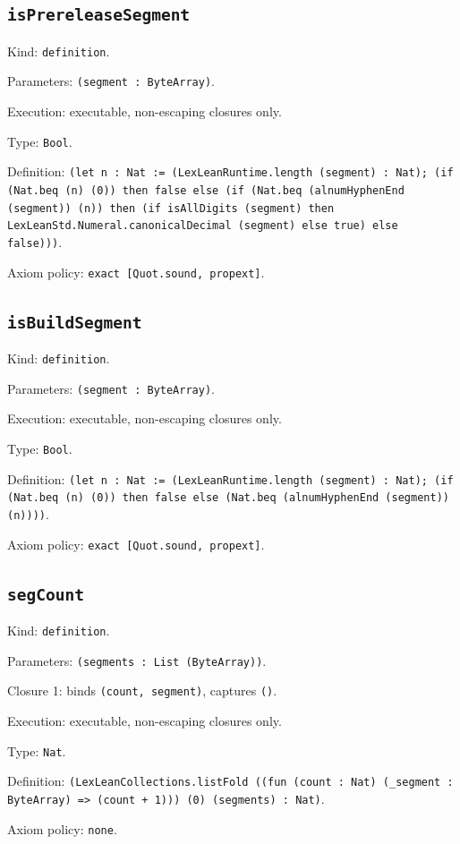 \documentclass[11pt]{article}
\begin{document}
\subsection*{\texttt{isPrereleaseSegment}}
\noindent Kind: \texttt{definition}.\par
\noindent Parameters: \texttt{(segment : ByteArray)}.\par
\noindent Execution: executable, non-escaping closures only.\par
\noindent Type: \texttt{Bool}.\par
\noindent Definition: \texttt{(let n : Nat := (LexLeanRuntime.length (segment) : Nat); (if (Nat.beq (n) (0)) then false else (if (Nat.beq (alnumHyphenEnd (segment)) (n)) then (if isAllDigits (segment) then LexLeanStd.Numeral.canonicalDecimal (segment) else true) else false)))}.\par
\noindent Axiom policy: \texttt{exact [Quot.sound, propext]}.\par
\subsection*{\texttt{isBuildSegment}}
\noindent Kind: \texttt{definition}.\par
\noindent Parameters: \texttt{(segment : ByteArray)}.\par
\noindent Execution: executable, non-escaping closures only.\par
\noindent Type: \texttt{Bool}.\par
\noindent Definition: \texttt{(let n : Nat := (LexLeanRuntime.length (segment) : Nat); (if (Nat.beq (n) (0)) then false else (Nat.beq (alnumHyphenEnd (segment)) (n))))}.\par
\noindent Axiom policy: \texttt{exact [Quot.sound, propext]}.\par
\subsection*{\texttt{segCount}}
\noindent Kind: \texttt{definition}.\par
\noindent Parameters: \texttt{(segments : List (ByteArray))}.\par
\noindent Closure 1: binds \texttt{(count, segment)}, captures \texttt{()}.\par
\noindent Execution: executable, non-escaping closures only.\par
\noindent Type: \texttt{Nat}.\par
\noindent Definition: \texttt{(LexLeanCollections.listFold ((fun (count : Nat) (\_segment : ByteArray) => (count + 1))) (0) (segments) : Nat)}.\par
\noindent Axiom policy: \texttt{none}.\par
\end{document}
